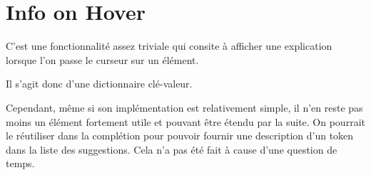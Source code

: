 \documentclass[
    iict, %
    il, %
]{heig-tb}
\begin{document}













\section{Info on Hover}

C'est une fonctionnalité assez triviale qui consite à afficher une explication lorsque l'on passe le curseur sur un élément.

Il s'agit donc d'une dictionnaire clé-valeur.

Cependant, même si son implémentation est relativement simple, il n'en reste pas moins un élément fortement utile et pouvant être étendu par la suite.
On pourrait le réutiliser dans la complétion pour pouvoir fournir une description d'un token dans la liste des suggestions.
Cela n'a pas été fait à cause d'une question de temps.
\end{document}
